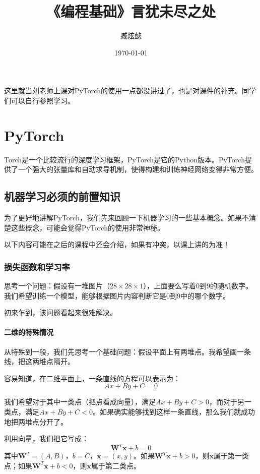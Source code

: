 \documentclass[fontset=none]{ctexart}
\title{\Huge\textbf{《编程基础》言犹未尽之处}}
\author{臧炫懿}
\date{\today}
\begin{document}
\maketitle

这里就当刘老师上课对PyTorch的使用一点都没讲过了，也是对课件的补充。同学们可以自行参照学习。

\tableofcontents

\section{PyTorch}

Torch是一个比较流行的深度学习框架，PyTorch是它的Python版本。PyTorch提供了一个强大的张量库和自动求导机制，使得构建和训练神经网络变得非常方便。

\subsection{机器学习必须的前置知识}

为了更好地讲解PyTorch，我们先来回顾一下机器学习的一些基本概念。如果不清楚这些概念，可能会觉得PyTorch的使用非常神秘。

以下内容可能在之后的课程中还会介绍，如果有冲突，以课上讲的为准！

\subsubsection{损失函数和学习率}

思考一个问题：假设有一堆图片（$28 \times 28 \times 1$），上面要么写着0到9的随机数字。我们希望训练一个模型，能够根据图片内容判断它是0到9中的哪个数字。

初来乍到，该问题看起来很难解决。

\paragraph{二维的特殊情况}

从特殊到一般，我们先思考一个基础问题：假设平面上有两堆点。我希望画一条线，把这两堆点隔开。

容易知道，在二维平面上，一条直线的方程可以表示为：
\[Ax + By + C = 0\]

我们希望对于其中一类点（把点看成向量），满足$Ax + By + C > 0$，而对于另一类点，满足$Ax + By + C < 0$。如果确实能够找到这样一条直线，那么我们就成功地把两堆点分开了。

利用向量，我们把它写成：
\[\mathbf{W}^T\mathbf{x} + b = 0\]
其中$\mathbf{W}^T = (A, B)$，$b = C$，$\mathbf{x} = (x, y)$。如果$\mathbf{W}^T\mathbf{x} + b > 0$，则$\mathbf{x}$属于第一类点；如果$\mathbf{W}^T\mathbf{x} + b < 0$，则$\mathbf{x}$属于第二类点。
\end{document}
